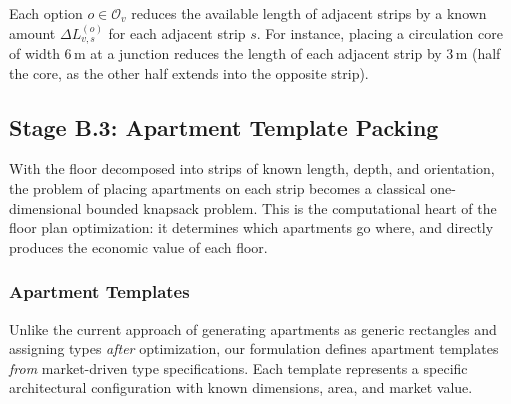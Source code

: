 \documentclass[11pt,a4paper]{article}
\newcommand{\calO}{\mathcal{O}}
\begin{document}
Each option $o \in \calO_v$ reduces the available length of adjacent
strips by a known amount $\Delta L_{v,s}^{(o)}$ for each adjacent strip
$s$. For instance, placing a circulation core of width 6\,m at a junction
reduces the length of each adjacent strip by 3\,m (half the core, as
the other half extends into the opposite strip).


\subsection{Stage B.3: Apartment Template Packing}\label{sec:knapsack}

With the floor decomposed into strips of known length, depth, and
orientation, the problem of placing apartments on each strip becomes a
classical one-dimensional bounded knapsack problem. This is the
computational heart of the floor plan optimization: it determines which
apartments go where, and directly produces the economic value of each
floor.

\subsubsection{Apartment Templates}

Unlike the current approach of generating apartments as generic
rectangles and assigning types \emph{after} optimization, our formulation
defines apartment templates \emph{from} market-driven type specifications.
Each template represents a specific architectural configuration with
known dimensions, area, and market value.
\end{document}

